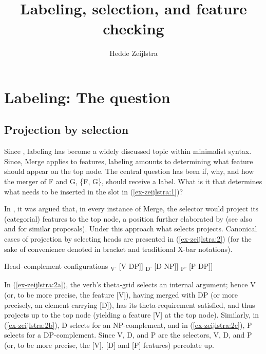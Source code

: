 \documentclass[output=paper
,modfonts
,nonflat]{langsci/langscibook}
\title{Labeling, selection, and feature checking}
\author{%
 Hedde Zeijlstra\affiliation{Georg-August-University Göttingen}
}
\begin{document}
	\maketitle

\section{Labeling: The question}
\subsection{Projection by selection}
Since \citet{Chomsky1995}, labeling has become a widely discussed topic within minimalist syntax. Since, Merge applies to features, labeling amounts to determining what feature should appear on the top node. The central question has been if, why, and how the merger of F and G, \{F, G\}, should receive a label. What is it that determines what needs to be inserted in the \ul{} slot in (\ref{ex-zeijlstra:1})?

\begin{figure}[!h]
\begin{exe} 
\exbox{\label{ex-zeijlstra:1}
	\begin{forest}	
		[ \ul{}
		[F]
		[G] ]
	\end{forest}}
\end{exe} \vspace{-1.3cm}
\end{figure}
\newpage\noindent In \citet{Chomsky1995}, it was argued that, in every instance of Merge, the selector would project its (categorial) features to the top node, a position further elaborated by \citet{Adger2003} (see also \citealt{Boeckx2008} and \citealt{Cecchetto_Donati2010} for similar proposals). Under this approach what selects projects. Canonical cases of projection by selecting heads are presented in (\ref{ex-zeijlstra:2}) (for the sake of convenience denoted in bracket and traditional X-bar notations). 

\begin{exe}
\ex Head–complement configurations \label{ex-zeijlstra:2}
	\xlist
	\ex {[} \textsubscript{V'} {[}V DP{]}{]} \label{ex-zeijlstra:2a}
	\ex {[} \textsubscript{D'} {[}D NP{]}{]} \label{ex-zeijlstra:2b}
	\ex {[} \textsubscript{P'} {[}P DP{]}{]} \label{ex-zeijlstra:2c}
	\endxlist
\end{exe}
In (\ref{ex-zeijlstra:2a}), the verb’s theta-grid selects an internal argument; hence V (or, to be more precise, the feature {[}V{]}), having merged with DP (or more precisely, an element carrying [D]), has its theta-requirement satisfied, and thus projects up to the top node (yielding a feature {[}V{]} at the top node). Similarly, in (\ref{ex-zeijlstra:2b}), D selects for an NP-complement, and in (\ref{ex-zeijlstra:2c}), P selects for a DP-complement. Since V, D, and P are the selectors, V, D, and P (or, to be more precise, the {[}V{]}, {[}D{]} and {[}P{]} features) percolate up.
\end{document}
